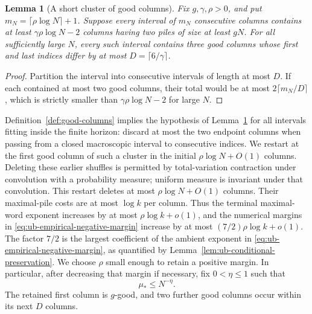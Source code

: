 \documentclass[11pt]{article}
\numberwithin{equation}{section}
\newtheorem{lemma}[lemma]{Lemma}
\newcommand{\1}{\mathbf 1}
\begin{document}
\begin{lemma}[A short cluster of good columns]
\label{lem:ub-good-cluster}
Fix $g,\gamma,\rho>0$, and put $m_N=\lceil\rho\log N\rceil+1$.
Suppose every interval of $m_N$ consecutive columns contains at least
$\gamma\rho\log N-2$ columns having two piles of size at least $gN$.
For all sufficiently large $N$, every such interval contains three
good columns whose first and last indices differ by at most
$D=\lceil6/\gamma\rceil$.
\end{lemma}

\begin{proof}
Partition the interval into consecutive intervals of length at most
\(D\). If each contained at most two good columns, their total would
be at most \(2\lceil m_N/D\rceil\), which is strictly
smaller than \(\gamma\rho\log N-2\) for large \(N\).
\end{proof}

Definition~\ref{def:good-columns} implies the hypothesis of
Lemma~\ref{lem:ub-good-cluster} for all intervals fitting inside
the finite horizon: discard at most the two endpoint columns when
passing from a closed macroscopic interval to consecutive indices.
We restart at the first good column of such a cluster in the initial
\(\rho\log N+O(1)\) columns. Deleting these earlier shuffles is
permitted by total-variation contraction under convolution with a
probability measure; uniform measure is invariant under that
convolution. This restart deletes at most \(\rho\log N+O(1)\)
columns. Their maximal-pile costs are at most \(\log k\) per column.
Thus the terminal maximal-word exponent increases by at most
\(\rho\log k+o(1)\), and the numerical margins in \eqref{eq:ub-empirical-negative-margin} increase
by at most \((7/2)\rho\log k+o(1)\). The factor \(7/2\) is the
largest coefficient of the ambient exponent in \eqref{eq:ub-empirical-negative-margin}, as quantified by
Lemma~\ref{lem:ub-conditional-preservation}. We choose \(\rho\) small enough to retain a positive
margin. In particular, after decreasing that margin if necessary, fix
\(0<\eta\le1\) such that
\begin{equation}
\label{eq:ub-exploration-maximal-mass}
 \mu_*\le N^{-\eta}.
\end{equation}
The retained first column is \(g\)-good, and two further good columns
occur within its next \(D\) columns.
\end{document}
